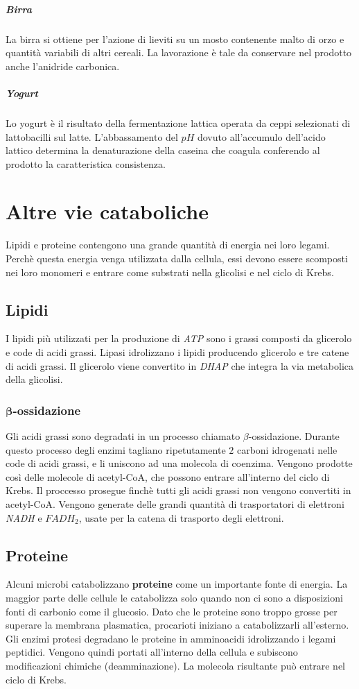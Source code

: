 				\subparagraph{Birra}
				La birra si ottiene per l'azione di lieviti su un mosto contenente malto di orzo e quantit\`a variabili di altri cereali. 
				La lavorazione \`e tale da conservare nel prodotto anche l'anidride carbonica.

				\subparagraph{Yogurt}
				Lo yogurt \`e il risultato della fermentazione lattica operata da ceppi selezionati di lattobacilli sul latte. 
				L'abbassamento del $pH$ dovuto all'accumulo dell'acido lattico determina la denaturazione della caseina che coagula conferendo al prodotto la caratteristica consistenza.

\section{Altre vie cataboliche}
Lipidi e proteine contengono una grande quantit\`a di energia nei loro legami. 
Perch\`e questa energia venga utilizzata dalla cellula, essi devono essere scomposti nei loro monomeri e entrare come substrati nella glicolisi e nel ciclo di Krebs.
	
	\subsection{Lipidi}
	I lipidi pi\`u utilizzati per la produzione di \emph{ATP} sono i grassi composti da glicerolo e code di acidi grassi. 
	Lipasi idrolizzano i lipidi producendo glicerolo e tre catene di acidi grassi. 
	Il glicerolo viene convertito in \emph{DHAP} che integra la via metabolica della glicolisi.
	
		\subsubsection{$\mathbf{\beta}$-ossidazione}
		Gli acidi grassi sono degradati in un processo chiamato $\beta$-ossidazione. 
		Durante questo processo degli enzimi tagliano ripetutamente $2$ carboni idrogenati nelle code di acidi grassi, e li uniscono ad una molecola di coenzima. 
		Vengono prodotte cos\`i delle molecole di acetyl-CoA, che possono entrare all'interno del ciclo di Krebs. 
		Il proccesso prosegue finch\`e tutti gli acidi grassi non vengono convertiti in acetyl-CoA. 
		Vengono generate delle grandi quantit\`a di trasportatori di elettroni \emph{NADH} e \emph{$FADH_2$}, usate per la catena di trasporto degli elettroni.

		
	\subsection{Proteine}
	Alcuni microbi catabolizzano \textbf{proteine} come un importante fonte di energia. 
	La maggior parte delle cellule le catabolizza solo quando non ci sono a disposizioni fonti di carbonio come il glucosio. 
	Dato che le proteine sono troppo grosse per superare la membrana plasmatica, procarioti iniziano a catabolizzarli all'esterno. 
	Gli enzimi protesi degradano le proteine in amminoacidi idrolizzando i legami peptidici. 
	Vengono quindi portati all'interno della cellula e subiscono modificazioni chimiche (deamminazione). 
	La molecola risultante pu\`o entrare nel ciclo di Krebs.
